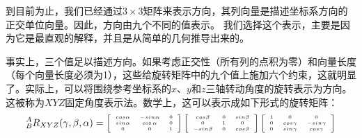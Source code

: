 到目前为止，我们已经通过$3\times 3$矩阵来表示方向，其列向量是描述坐标系方向的正交单位向量。因此，方向由九个不同的值表示。 我们选择这个表示，主要是因为它是最直观的解释，并且是从简单的几何推导出来的。


事实上，三个值足以描述方向。如果考虑正交性（所有列的点积为零）和向量长度（每个向量长度必须为1），这些给旋转矩阵中的九个值上施加六个约束，这就明显了。实际上，可以将围绕参考坐标系的$x$、$y$和$z$三轴转动角度的旋转表示为方向。 这被称为$XYZ$固定角度表示法。数学上，这可以表示成如下形式的旋转矩阵：
\begin{equation}
\tiny
^A_BR_{XYZ}(\gamma,\beta,\alpha)=\left[\begin{array}{ccc}cos\alpha & -sin\alpha & 0\\sin\alpha & \cos\alpha & 0\\0 & 0 & 1\end{array}\right]\left[\begin{array}{ccc}cos\beta& 0 & sin\beta\\0 & 1 & 0\\-sin\beta & 0 & cos\beta\end{array}\right]\left[\begin{array}{ccc}1 & 0 & 0 \\0 & cos\gamma & -sin\gamma\\0 & sin\gamma & cos\gamma\end{array}\right]
\end{equation}


